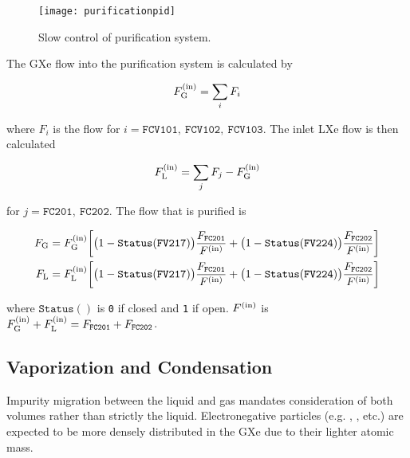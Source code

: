 \begin{figure}
\centering
\texttt{[image: purificationpid]}
\caption{Slow control of purification system.}
\label{fig:electron_lifetime_model_slow_control_pur}
\end{figure}

The GXe flow into the purification system is calculated by

\begin{equation}
F_{\mathrm{G}}^{(\mathrm{in})} = \sum_i F_i
\end{equation}

\noindent where $F_i$ is the flow for $i = \mathtt{FCV101,\ FCV102,\ FCV103}$.  The inlet LXe flow is then calculated

\begin{equation}
F_{\mathrm{L}}^{(\mathrm{in})} = \sum_j F_j - F_{\mathrm{G}}^{(\mathrm{in})}
\end{equation}

\noindent for $j = \mathtt{FC201,\ FC202}$.  The flow that is purified is

\begin{subequations}
\begin{align}
F_{\mathrm{G}} &= F_{\mathrm{G}}^{(\mathrm{in})} \bigg[ \big(1 - \mathtt{Status(FV217)}\big) \frac{F_{\mathtt{FC201}}}{F^{(\mathrm{in})}} +
\big(1 - \mathtt{Status(FV224)}\big) \frac{F_{\mathtt{FC202}}}{F^{(\mathrm{in})}} \bigg]
\\
F_{\mathrm{L}} &= F_{\mathrm{L}}^{(\mathrm{in})} \bigg[ \big(1 - \mathtt{Status(FV217)}\big) \frac{F_{\mathtt{FC201}}}{F^{(\mathrm{in})}} +
\big(1 - \mathtt{Status(FV224)}\big) \frac{F_{\mathtt{FC202}}}{F^{(\mathrm{in})}} \bigg]
\end{align}
\end{subequations}

\noindent where $\mathtt{Status()}$ is \texttt{0} if closed and \texttt{1} if open.  $F^{(\mathrm{in})}$ is
$F_{\mathrm{G}}^{(\mathrm{in})} + F_{\mathrm{L}}^{(\mathrm{in})} = F_{\mathtt{FC201}} + F_{\mathtt{FC202}}$.



\subsection{Vaporization and Condensation}
\label{subsec:electron_lifetime_model_vap_and_cond}
Impurity migration between the liquid and gas mandates consideration of both volumes rather than strictly the liquid.  Electronegative
particles (e.g. , , etc.) are expected to be more densely distributed in the GXe due to their lighter atomic mass.

